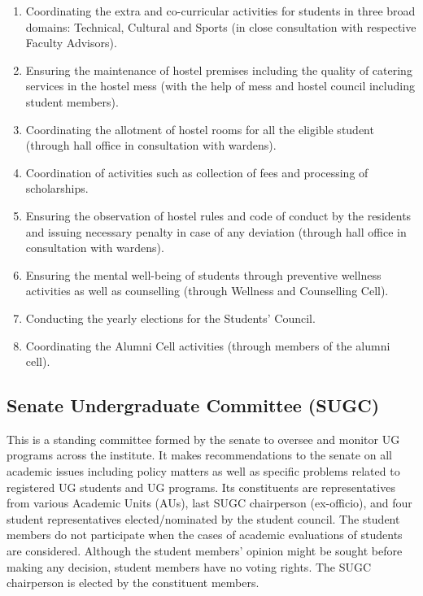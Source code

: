 \begin{enumerate}
	\item Coordinating the extra and co-curricular activities for students in three broad domains: Technical, Cultural and Sports (in close consultation with respective Faculty Advisors).
	\item Ensuring the maintenance of hostel premises including the quality of catering services in the hostel mess (with the help of mess and hostel council including student members).
	\item Coordinating the allotment of hostel rooms for all the eligible student (through hall office in consultation with wardens).
	\item Coordination of activities such as collection of fees and processing of scholarships.
	\item Ensuring the observation of hostel rules and code of conduct by the residents and issuing necessary penalty in case of any deviation (through hall office in consultation with wardens).
	\item Ensuring the mental well-being of students through preventive wellness activities as well as counselling (through Wellness and Counselling Cell).
	\item Conducting the yearly elections for the Students’ Council.
	\item Coordinating the Alumni Cell activities (through members of the alumni cell).
\end{enumerate}

\subsection{Senate Undergraduate Committee (SUGC)}

This is a standing committee formed by the senate to oversee and monitor UG programs across the institute. It makes recommendations to the senate on all academic issues including policy matters as well as specific problems related to registered UG students and UG programs. Its constituents are representatives from various Academic Units (AUs), last SUGC chairperson (ex-officio), and four student representatives elected/nominated by the student council. The student members do not participate when the cases of academic evaluations of students are considered. Although the student members' opinion might be sought before making any decision, student members have no voting rights. The SUGC chairperson is elected by the constituent members. 

